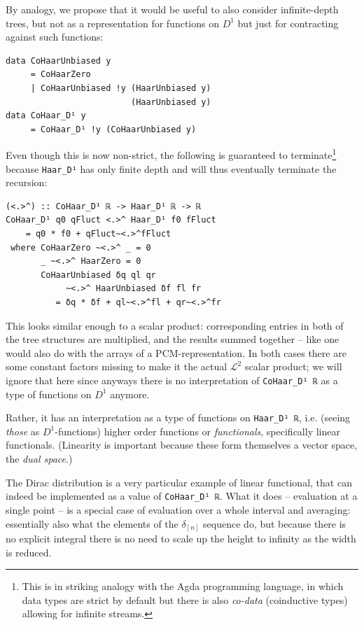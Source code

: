 \documentclass[sigplan,screen]{acmart}
\theoremstyle{acmplain}
\theoremstyle{acmdefinition}
\begin{document}
By analogy, we propose that it would be useful to also consider infinite-depth trees, but not as a representation for functions on $D^1$ but just for contracting against such functions:
\begin{lstlisting}
data CoHaarUnbiased y
     = CoHaarZero
     | CoHaarUnbiased !y (HaarUnbiased y)
                         (HaarUnbiased y)
data CoHaar_D¹ y
     = CoHaar_D¹ !y (CoHaarUnbiased y)
\end{lstlisting}
Even though this is now non-strict, the following is guaranteed to terminate\footnote{%
This is in striking analogy with the Agda programming language, in which data types are strict by default but there is also \emph{co-data} (coinductive types) allowing for infinite streams.
} because \verb`Haar_D¹` has only finite depth and will thus eventually terminate the recursion:
\begin{lstlisting}
(<.>^) :: CoHaar_D¹ ℝ -> Haar_D¹ ℝ -> ℝ
CoHaar_D¹ q0 qFluct <.>^ Haar_D¹ f0 fFluct
    = q0 * f0 + qFluct~<.>^fFluct
 where CoHaarZero ~<.>^ _ = 0
       _ ~<.>^ HaarZero = 0
       CoHaarUnbiased δq ql qr
            ~<.>^ HaarUnbiased δf fl fr
          = δq * δf + ql~<.>^fl + qr~<.>^fr
\end{lstlisting}
This looks similar enough to a scalar product: corresponding entries in both of the tree structures are multiplied, and the results summed together -- like one would also do with the arrays of a PCM-representation. In both cases there are some constant factors missing to make it the actual $\mathcal{L}^2$ scalar product; we will ignore that here since anyways there is no interpretation of \verb`CoHaar_D¹ ℝ` as a type of functions on $D^1$ anymore.

Rather, it has an interpretation as a type of functions on \verb`Haar_D¹ ℝ`, i.e. (seeing \emph{those} as $D^1$-functions) higher order functions or \emph{functionals}, specifically linear functionals. (Linearity is important because these form themselves a vector space, the \emph{dual space}.)

The Dirac distribution is a very particular example of linear functional, that can indeed be implemented as a value of \verb`CoHaar_D¹ ℝ`. What it does -- evaluation at a single point -- is a special case of evaluation over a whole interval and averaging: essentially also what the elements of the $\delta_{[n]}$ sequence do, but because there is no explicit integral there is no need to scale up the height to infinity as the width is reduced.
\end{document}
